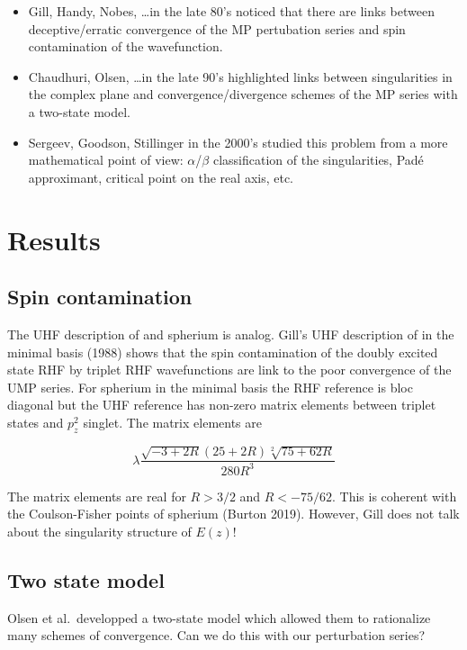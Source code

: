\documentclass{article}
\begin{document}
\begin{itemize}
\item Gill, Handy, Nobes, \ldots in the late 80's noticed that there are links between deceptive/erratic convergence of the MP pertubation series and spin contamination of the wavefunction.

\item Chaudhuri, Olsen, \ldots in the late 90's highlighted links between singularities in the complex plane and convergence/divergence schemes of the MP series with a two-state model.

\item Sergeev, Goodson, Stillinger in the 2000's studied this problem from a more mathematical point of view: $\alpha$/$\beta$ classification of the singularities, Pad\'e approximant, critical point on the real axis, etc.
\end{itemize}

\section{Results}

\subsection{Spin contamination}
The UHF description of  and spherium is analog. 
Gill's UHF description of  in the minimal basis (1988) shows that the spin contamination of the doubly excited state RHF by triplet RHF wavefunctions are link to the poor convergence of the UMP series. 
For spherium in the minimal basis the RHF reference is bloc diagonal but the UHF reference has non-zero matrix elements between triplet states and $p_z^2$ singlet. 
The matrix elements are

\begin{equation}
	\lambda\frac{\sqrt{-3+2R}(25+2R)\sqrt[2]{75+62R}}{280 R^{3}}
\end{equation}

The matrix elements are real for $R > 3/2$ and $R < -75/62$. 
This is coherent with the Coulson-Fisher points of spherium (Burton 2019).
However, Gill does not talk about the singularity structure of $E(z)$!

\subsection{Two state model}

Olsen et al.~developped a two-state model which allowed them to rationalize many schemes of convergence. 
Can we do this with our perturbation series? 
\end{document}
